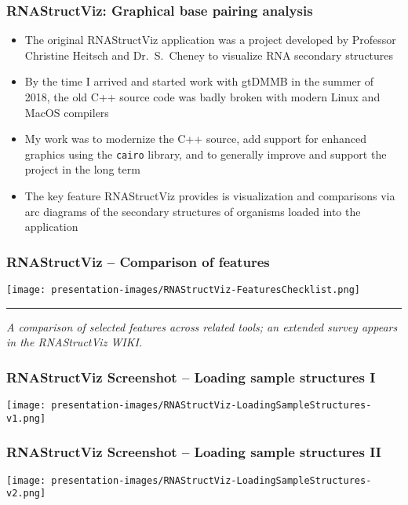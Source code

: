\documentclass[usenames,svgnames,dvipsnames,11pt]{beamer}
\begin{document}
\begin{frame}
\frametitle{RNAStructViz: Graphical base pairing analysis}
\begin{itemize} 

\item The original RNAStructViz application was a project developed by 
      Professor Christine Heitsch and Dr.~S.~Cheney  
      to visualize RNA secondary structures 
\item By the time I arrived and started work with gtDMMB in the summer of 2018, the old C++ source 
      code was badly broken with modern Linux and MacOS compilers 
\item My work was to modernize the C++ source, add support for enhanced graphics using the 
      \texttt{cairo} library, and to generally improve and support the project in the long term
\item The key feature RNAStructViz provides is visualization and comparisons via arc diagrams 
      of the secondary structures of organisms loaded into the application

\end{itemize}

\end{frame}

\begin{frame}[fragile]
\frametitle{RNAStructViz -- Comparison of features}

\begin{center}
\texttt{[image: presentation-images/RNAStructViz-FeaturesChecklist.png]}
\end{center}

\hrule\medskip
\it A comparison of selected features across related tools; 
an extended survey appears in the RNAStructViz WIKI. 

\end{frame}

\begin{frame}[fragile]
\frametitle{RNAStructViz Screenshot -- Loading sample structures I}

\begin{center}
\texttt{[image: presentation-images/RNAStructViz-LoadingSampleStructures-v1.png]}
\end{center}

\end{frame}

\begin{frame}[fragile]
\frametitle{RNAStructViz Screenshot -- Loading sample structures II}

\begin{center}
\texttt{[image: presentation-images/RNAStructViz-LoadingSampleStructures-v2.png]}
\end{center}

\end{frame}
\end{document}
